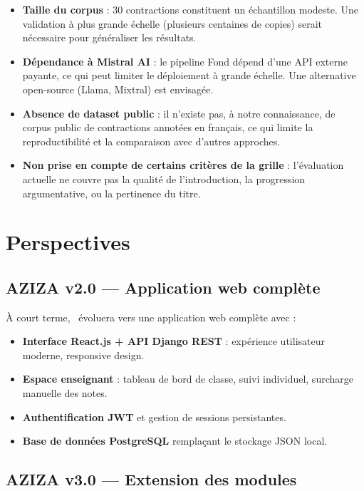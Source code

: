 \begin{itemize}
    \item \textbf{Taille du corpus} : 30 contractions constituent un échantillon modeste. Une validation à plus grande échelle (plusieurs centaines de copies) serait nécessaire pour généraliser les résultats.
    \item \textbf{Dépendance à Mistral AI} : le pipeline Fond dépend d'une API externe payante, ce qui peut limiter le déploiement à grande échelle. Une alternative open-source (Llama, Mixtral) est envisagée.
    \item \textbf{Absence de dataset public} : il n'existe pas, à notre connaissance, de corpus public de contractions annotées en français, ce qui limite la reproductibilité et la comparaison avec d'autres approches.
    \item \textbf{Non prise en compte de certains critères de la grille} : l'évaluation actuelle ne couvre pas la qualité de l'introduction, la progression argumentative, ou la pertinence du titre.
\end{itemize}

\section*{Perspectives}

\subsection*{AZIZA v2.0 — Application web complète}

À court terme, \AZIZA\ évoluera vers une application web complète avec :

\begin{itemize}
    \item \textbf{Interface React.js + API Django REST} : expérience utilisateur moderne, responsive design.
    \item \textbf{Espace enseignant} : tableau de bord de classe, suivi individuel, surcharge manuelle des notes.
    \item \textbf{Authentification JWT} et gestion de sessions persistantes.
    \item \textbf{Base de données PostgreSQL} remplaçant le stockage JSON local.
\end{itemize}

\subsection*{AZIZA v3.0 — Extension des modules}

